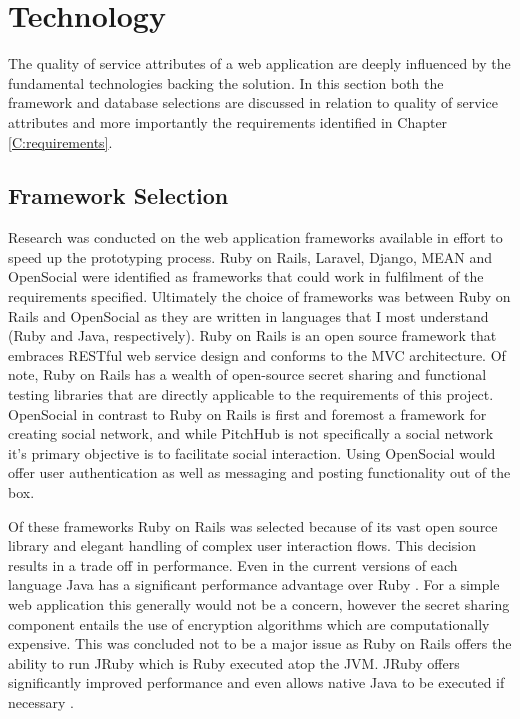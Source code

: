 \section{Technology}

The quality of service attributes of a web application are deeply influenced by the fundamental technologies backing the solution. In this section both the framework and database selections are discussed in relation to quality of service attributes and more importantly the requirements identified in Chapter \ref{C:requirements}.

\subsection{Framework Selection}\label{SS:frameworkSelection}

Research was conducted on the web application frameworks available in effort to speed up the prototyping process. Ruby on Rails, Laravel, Django, MEAN and OpenSocial were identified as frameworks that could work in fulfilment of the requirements specified. Ultimately the choice of frameworks was between Ruby on Rails and OpenSocial as they are written in languages that I most understand (Ruby and Java, respectively). Ruby on Rails is an open source framework that embraces RESTful web service design and conforms to the MVC architecture. Of note, Ruby on Rails has a wealth of open-source secret sharing and functional testing libraries that are directly applicable to the requirements of this project. OpenSocial in contrast to Ruby on Rails is first and foremost a framework for creating social network, and while PitchHub is not specifically a social network it's primary objective is to facilitate social interaction. Using OpenSocial would offer user authentication as well as messaging and posting functionality out of the box. 
\par
Of these frameworks Ruby on Rails was selected because of its vast open source library and elegant handling of complex user interaction flows. This decision results in a trade off in performance. Even in the current versions of each language Java has a significant  performance advantage over Ruby \cite{Perfo1:online}. For a simple web application this generally would not be a concern, however the secret sharing component entails the use of encryption algorithms which are computationally expensive. This was concluded not to be a major issue as Ruby on Rails offers the ability to run JRuby which is Ruby executed atop the JVM. JRuby offers significantly improved performance and even allows native Java to be executed if necessary \cite{Jruby:online}.

